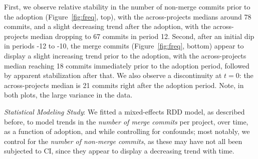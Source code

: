 First, we observe relative stability in the number of non-merge commits prior 
to the \Tvis adoption (Figure~\ref{fig:freq}, top), with the across-projects medians 
around 78 commits, and a slight decreasing trend after the adoption, with the
across-projects median dropping to 67 commits in period 12.
Second, after an initial dip in periods -12 to -10, the merge commits 
(Figure~\ref{fig:freq}, bottom) appear to display a slight increasing trend prior 
to the \Tvis adoption, with the across-projects median reaching 18 commits 
immediately prior to the adoption period, followed by apparent stabilization 
after that.
We also observe a discontinuity at $t=0$: the across-projects median is 21 
commits right after the adoption period.
Note, in both plots, the large variance in the data.



\smallskip\noindent \emph{Statistical Modeling Study}: 
We fitted a mixed-effects RDD model, as described before, to model trends
in the \emph{number of merge commits} per project, over time, as a function 
of \Tvis adoption, and while controlling for confounds; most notably, we control 
for the \emph{number of non-merge commits}, as these may have not all been 
subjected to CI, since they appear to display a decreasing trend with time.


%

